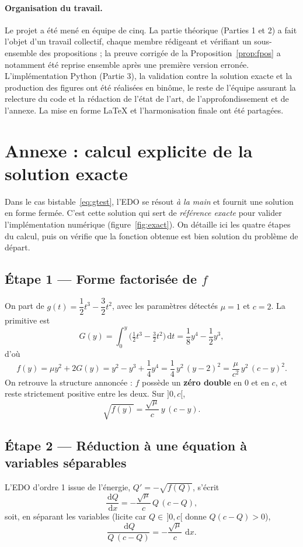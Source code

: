 \documentclass[11pt,a4paper]{article}
\theoremstyle{plain}
\theoremstyle{remark}
\newcommand{\dd}{\,\mathrm{d}}
\begin{document}
\paragraph{Organisation du travail.}
Le projet a été mené en équipe de cinq. La partie théorique (Parties 1 et 2) a
fait l'objet d'un travail collectif, chaque membre rédigeant et vérifiant un
sous-ensemble des propositions ; la preuve corrigée de la
Proposition~\ref{prop:fpos} a notamment été reprise ensemble après une première
version erronée. L'implémentation Python (Partie 3), la validation contre la
solution exacte et la production des figures ont été réalisées en binôme, le
reste de l'équipe assurant la relecture du code et la rédaction de l'état de
l'art, de l'approfondissement et de l'annexe. La mise en forme \LaTeX{} et
l'harmonisation finale ont été partagées.

\clearpage
\appendix
\section{Annexe : calcul explicite de la solution exacte}
\label{sec:annexe}

Dans le cas bistable~\eqref{eq:gtest}, l'EDO se résout \emph{à la main} et
fournit une solution en forme fermée. C'est cette solution qui sert de
\emph{référence exacte} pour valider l'implémentation numérique
(figure~\ref{fig:exact}). On détaille ici les quatre étapes du calcul, puis on
vérifie que la fonction obtenue est bien solution du problème de départ.

\subsection*{Étape 1 — Forme factorisée de $f$}
On part de $g(t)=\dfrac12 t^3-\dfrac32 t^2$, avec les paramètres détectés
$\mu=1$ et $c=2$. La primitive est
\[
  G(y)=\int_0^y\!\Big(\tfrac12 t^3-\tfrac32 t^2\Big)\dd t
       =\frac{1}{8}y^4-\frac{1}{2}y^3,
\]
d'où
\[
  f(y)=\mu y^2+2G(y)=y^2-y^3+\frac{1}{4}y^4
      =\frac{1}{4}\,y^2\,(y-2)^2
      =\frac{\mu}{c^2}\,y^2\,(c-y)^2.
\]
On retrouve la structure annoncée : $f$ possède un \textbf{zéro double} en $0$
et en $c$, et reste strictement positive entre les deux. Sur $]0,c[$,
\[
  \sqrt{f(y)}=\frac{\sqrt{\mu}}{c}\,y\,(c-y).
\]

\subsection*{Étape 2 — Réduction à une équation à variables séparables}
L'EDO d'ordre 1 issue de l'énergie, $Q'=-\sqrt{f(Q)}$, s'écrit
\[
  \frac{\dd Q}{\dd x}=-\frac{\sqrt{\mu}}{c}\,Q\,(c-Q),
\]
soit, en séparant les variables (licite car $Q\in\,]0,c[$ donne $Q(c-Q)>0$),
\[
  \frac{\dd Q}{Q\,(c-Q)}=-\frac{\sqrt{\mu}}{c}\,\dd x.
\]
\end{document}
